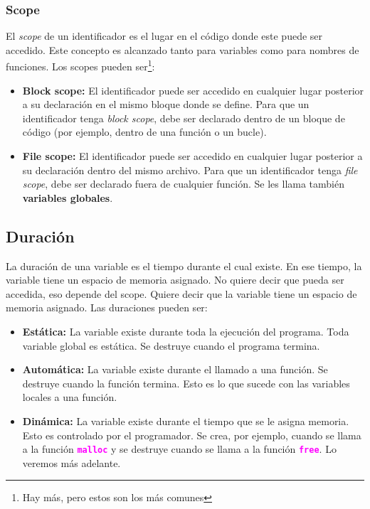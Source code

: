 \documentclass[]{scrartcl}
\newcommand{\hl}[1]{\textcolor{magenta}{\textbf{\texttt{#1}}}}
\begin{document}
\subsubsection*{Scope}
El \textit{scope} de un identificador es el lugar en el código donde este puede ser accedido. Este concepto es alcanzado tanto para variables como para nombres de funciones.
Los scopes pueden ser\footnote{Hay más, pero estos son los más comunes}:
\begin{itemize}
    \item \textbf{Block scope:} El identificador puede ser accedido en cualquier lugar posterior a su declaración en el mismo bloque donde se define. Para que un identificador tenga \textit{block scope}, debe ser declarado dentro de un bloque de código (por ejemplo, dentro de una función o un bucle).
    \item \textbf{File scope:} El identificador puede ser accedido en cualquier lugar posterior a su declaración dentro del mismo archivo. Para que un identificador tenga \textit{file scope}, debe ser declarado fuera de cualquier función. Se les llama también \textbf{variables globales}.
\end{itemize}

\subsection*{Duración}
La duración de una variable es el tiempo durante el cual existe. En ese tiempo, la variable tiene un espacio de memoria asignado. No quiere decir que pueda ser accedida, eso depende del scope. Quiere decir que la variable tiene un espacio de memoria asignado.
Las duraciones pueden ser:
\begin{itemize}
    \item \textbf{Estática:} La variable existe durante toda la ejecución del programa. Toda variable global es estática. Se destruye cuando el programa termina.
    \item \textbf{Automática:} La variable existe durante el llamado a una función. Se destruye cuando la función termina. Esto es lo que sucede con las variables locales a una función.
    \item \textbf{Dinámica:} La variable existe durante el tiempo que se le asigna memoria. Esto es controlado por el programador. Se crea, por ejemplo, cuando se llama a la función \hl{malloc} y se destruye cuando se llama a la función \hl{free}. Lo veremos más adelante.
\end{itemize}
\end{document}
